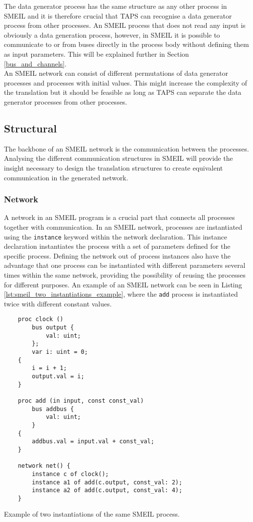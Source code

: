 The data generator process has the same structure as any other process in SMEIL and it is therefore crucial that TAPS can recognise a data generator process from other processes. An SMEIL process that does not read any input is obviously a data generation process, however, in SMEIL it is possible to communicate to or from buses directly in the process body without defining them as input parameters. This will be explained further in Section \ref{bus_and_channels}. \\

An SMEIL network can consist of different permutations of data generator processes and processes with initial values. This might increase the complexity of the translation but it should be feasible as long as TAPS can separate the data generator processes from other processes.
\subsection{Structural}
\label{sec:analysis_structural}
The backbone of an SMEIL network is the communication between the processes. Analysing the different communication structures in SMEIL will provide the insight necessary to design the translation structures to create equivalent communication in the generated \cspm{} network.
\subsubsection{Network}
A network in an SMEIL program is a crucial part that connects all processes together with communication. In an SMEIL network, processes are instantiated using the \texttt{instance} keyword within the network declaration. This instance declaration instantiates the process with a set of parameters defined for the specific process.
Defining the network out of process instances also have the advantage that one process can be instantiated with different parameters several times within the same network, providing the possibility of reusing the processes for different purposes. An example of an SMEIL network can be seen in Listing \ref{lst:smeil_two_instantiations_example}, where the \texttt{add} process is instantiated twice with different constant values.\\
\begin{listing}
    \begin{verbatim}
    proc clock ()
        bus output {
            val: uint;
        };
        var i: uint = 0;
    {
        i = i + 1;
        output.val = i;
    }

    proc add (in input, const const_val)
        bus addbus {
            val: uint;
        }
    {
        addbus.val = input.val + const_val;
    }

    network net() {
        instance c of clock();
        instance a1 of add(c.output, const_val: 2);
        instance a2 of add(c.output, const_val: 4);
    }
    \end{verbatim}
    \caption{Example of two instantiations of the same SMEIL process.}
    \label{lst:smeil_two_instantiations_example}
\end{listing}

